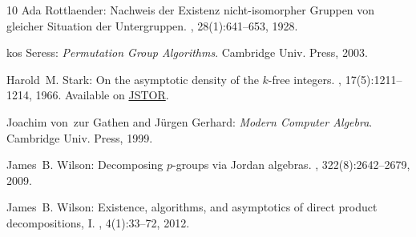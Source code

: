 \documentclass[11pt]{article}
\numberwithin{equation}{section}
\theoremstyle{definition}
\theoremstyle{plain}
\numberwithin{equation}{section}
\theoremstyle{plain}       %
\theoremstyle{remark}
\theoremstyle{definition}
\numberwithin{figure}{section}
\numberwithin{table}{section}
\begin{document}
\begin{thebibliography}{10}
{\sc Ada Rottlaender}: Nachweis der {E}xistenz nicht-isomorpher {G}ruppen von
  gleicher {S}ituation der {U}ntergruppen.
, 28(1):641--653, 1928.
\newblock [\epfmtdoi{10.1007/BF01181188}]

{kos Seress}: {\em Permutation Group Algorithms}.
\newblock Cambridge Univ. Press, 2003.

{\sc Harold~M. Stark}: On the asymptotic density of the {$k$}-free integers.
, 17(5):1211--1214, 1966.
\newblock Available on \href{https://www.jstor.org/stable/2036123}{JSTOR}.

{\sc Joachim von~zur Gathen and J{\"u}rgen Gerhard}: {\em Modern Computer
  Algebra}.
\newblock Cambridge Univ. Press, 1999.

{\sc James~B. Wilson}: Decomposing $p$-groups via {J}ordan algebras.
, 322(8):2642--2679, 2009.

{\sc James~B. Wilson}: Existence, algorithms, and asymptotics of direct product
  decompositions, {I}.
, 4(1):33--72, 2012.

\end{thebibliography}
\end{document}
